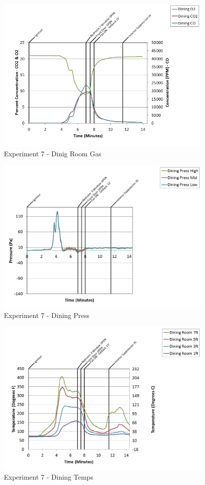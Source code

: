 \documentclass{article}
\begin{document}
\begin{appendices}
\clearpage

\begin{figure}[h!]
	\centering
	\includegraphics[height=3.05in]{0_Images/Results_Charts/Exp_7_Charts/DinigRoomGas.png}
	\caption{Experiment 7 - Dinig Room Gas}
\end{figure}


\begin{figure}[h!]
	\centering
	\includegraphics[height=3.05in]{0_Images/Results_Charts/Exp_7_Charts/DiningPress.png}
	\caption{Experiment 7 - Dining Press}
\end{figure}

\clearpage

\begin{figure}[h!]
	\centering
	\includegraphics[height=3.05in]{0_Images/Results_Charts/Exp_7_Charts/DiningTemps.png}
	\caption{Experiment 7 - Dining Temps}
\end{figure}



\end{appendices}
\end{document}
